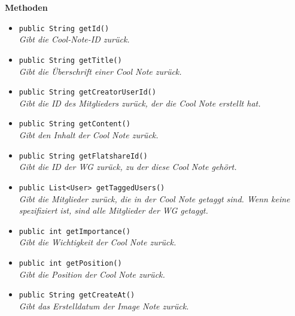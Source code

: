 	\textbf{Methoden}
	\begin{itemize}
		\item\texttt{{public String getId()}}\\
		\textit{Gibt die Cool-Note-ID zurück.}\\
		
		\item\texttt{{public String getTitle()}}\\
		\textit{Gibt die Überschrift einer Cool Note zurück.}\\
		
		\item\texttt{{public String getCreatorUserId()}}\\
		\textit{Gibt die ID des Mitglieders zurück, der die Cool Note erstellt hat.}\\
		
		\item\texttt{{public String getContent()}}\\
		\textit{Gibt den Inhalt der Cool Note zurück.}\\
		
		\item\texttt{{public String getFlatshareId()}}\\
		\textit{Gibt die ID der WG zurück, zu der diese Cool Note gehört.}\\
		
		\item\texttt{{public List<User> getTaggedUsers()}}\\
		\textit{Gibt die Mitglieder zurück, die in der Cool Note getaggt sind. Wenn keine spezifiziert ist, sind alle Mitglieder der WG getaggt.}\\
		
		\item\texttt{public int getImportance()}\\
		\textit{Gibt die Wichtigkeit der Cool Note zurück.}\\
		
		\item\texttt{{public int getPosition()}}\\
		\textit{Gibt die Position der Cool Note zurück.}\\
		
		\item\texttt{{public String getCreateAt()}}\\
		\textit{Gibt das Erstelldatum der Image Note zurück.}\\
	\end{itemize}

